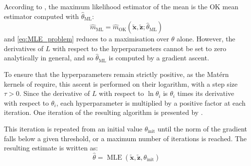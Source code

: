 According to , the maximum likelihood estimator of the mean is the OK mean estimator computed with $\hat{\theta}_{\mathrm{ML}}$:
\begin{equation}
	\hat{m}_{\mathrm{ML}}=\hat{m}_{\mathrm{OK}}\left(\tilde{\mathbf{x}},\tilde{\mathbf{z}};\hat{\theta}_{\mathrm{ML}}\right)
\end{equation}
and \eqref{eq:MLE_problem} reduces to a maximisation over $\theta$ alone. However, the derivatives of $L$ with respect to the hyperparameters cannot be set to zero analytically in general, and so $\hat{\theta}_{\mathrm{ML}}$ is computed by a gradient ascent.

To ensure that the hyperparameters remain strictly positive, as the Matérn kernels of  require, this ascent is performed on their logarithm, with a step size $\tau>0$. Since the derivative of $L$ with respect to $\ln\theta_i$ is $\theta_i$ times its derivative with respect to $\theta_i$, each hyperparameter is multiplied by a positive factor at each iteration. One iteration of the resulting algorithm is presented by .

\begin{algorithm}[!htb]
	\begin{algorithmic}
	\end{algorithmic}\caption{Maximum Likelihood Estimation}\label{alg:MLE}
\end{algorithm}

This iteration is repeated from an initial value $\theta_{\mathrm{init}}$ until the norm of the gradient falls below a given threshold, or a maximum number of iterations is reached. The resulting estimate is written as:
\begin{equation}
	\hat{\theta}=\operatorname{MLE}\left(\tilde{\mathbf{x}},\tilde{\mathbf{z}},\theta_{\mathrm{init}}\right)
\end{equation}

